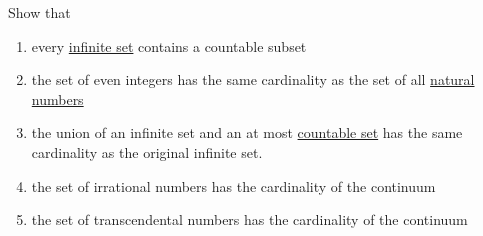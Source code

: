   \begin{exercise}[Zorich 2.4.3]
    Show that 
    \begin{enumerate}
      \item every \hyperref[st-def:infinite-set]{infinite set} contains a countable subset
      \item the set of even integers has the same cardinality as the set of all \hyperref[st-def:naturals]{natural numbers}
      \item the union of an infinite set and an at most \hyperref[st-def:countable]{countable set} has the same cardinality as the original infinite set. 
      \item the set of irrational numbers has the cardinality of the continuum 
      \item the set of transcendental numbers has the cardinality of the continuum
    \end{enumerate}
  \end{exercise}
